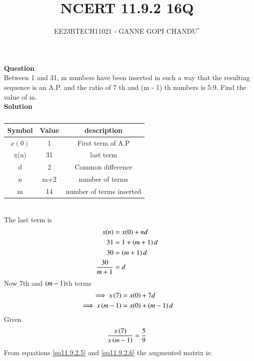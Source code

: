 \documentclass[journal,12pt,twocolumn]{IEEEtran}
\theoremstyle{remark}
\begin{document}

\vspace{3cm}
\title{NCERT 11.9.2 16Q}
\author{EE23BTECH11021 - GANNE GOPI CHANDU$^{*}$%
}
\maketitle
\newpage
\bigskip
\renewcommand{\thefigure}{\theenumi}
\renewcommand{\thetable}{\theenumi}

\textbf{Question}\\
Between 1 and 31, m numbers have been inserted in such a way that the resulting sequence is an A.P. and 
the ratio of 7
th and (m - 1)
th numbers is 5:9. Find the value of m.\\
\textbf{Solution}\\
\begin{table}[!h]
\begin{center}
\renewcommand\thetable{1}
\begin{tabular}{ |c|c|c| } 
  \hline
    Symbol & Value & description \\ 
  \hline
  $x(0)$ & 1 & First term of A.P  \\ 
  \hline
  x(n) & 31 & last term \\
  \hline
  d & 2 & Common difference \\ 
  \hline
  n & m+2 & number of terms \\
  \hline
  m & 14 & number of terms inserted \\
  \hline
\end{tabular}
\end{center}
\caption{}
\end{table}\\
The last term is
\begin{align}
x(n)&=x(0)+nd\\
31 &= 1 + \left(m + 1\right)d \\
30 &= \left(m + 1\right)d \\
\frac{30}{m + 1} &= d \label{eq11.9.2.4}
\end{align}
Now $7$th and $\left(m-1\right)$th terms
\begin{align}
\implies x\left(7\right) &= x(0) + 7d\label{eq11.9.2.5}\\
\implies x\left(m-1\right) &= x(0) + \left(m-1\right)d\label{eq11.9.2.6}
\end{align}
Given 
\begin{align}
\frac{x\left(7\right)}{x\left(m-1\right)} = \frac{5}{9} \label{eq11.9.2.7}
\end{align}
From  equations \eqref{eq11.9.2.5} and \eqref{eq11.9.2.6} the augmented matrix is:\\
\end{document}
